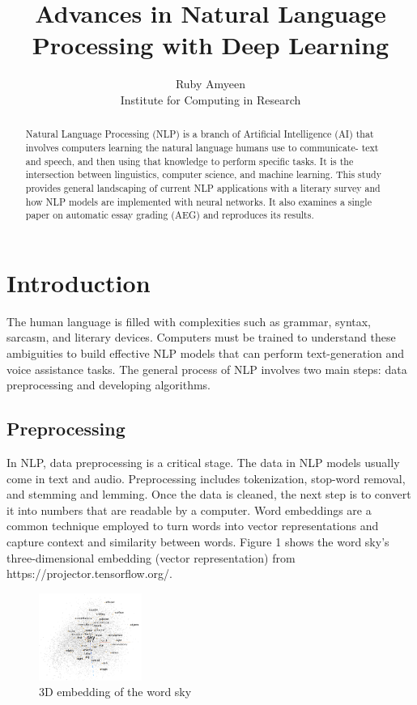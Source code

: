 \documentclass[11pt]{article}
\title{Advances in Natural Language Processing with Deep Learning}
\author{Ruby Amyeen \\
  Institute for Computing in Research \\
  }
\begin{document}
\maketitle
\begin{abstract}
Natural Language Processing (NLP) is a branch of Artificial Intelligence (AI) that involves computers learning the natural language humans use to communicate- text and speech, and then using that knowledge to perform specific tasks. It is the intersection between linguistics, computer science, and machine learning. 
This study provides general landscaping of current NLP applications with a literary survey and how NLP models are implemented with neural networks. It also examines a single paper on automatic essay grading (AEG) and reproduces its results.


\end{abstract}

\section{Introduction}
The human language is filled with complexities such as grammar, syntax, sarcasm, and literary devices. Computers must be trained to understand these ambiguities to build effective NLP models that can perform text-generation and voice assistance tasks. The general process of NLP involves two main steps: data preprocessing and developing algorithms.

\subsection{Preprocessing}
In NLP, data preprocessing is a critical stage. The data in NLP models usually come in text and audio. Preprocessing includes tokenization, stop-word removal, and stemming and lemming. Once the data is cleaned, the next step is to convert it into numbers that are readable by a computer. Word embeddings are a common technique employed to turn words into vector representations and capture context and similarity between words. 
Figure 1 shows the word sky's three-dimensional embedding (vector representation) from https://projector.tensorflow.org/.

\begin{figure}
\centering
\includegraphics[width=0.3\textwidth]{sky_word_embedding.png}
\caption{3D embedding of the word sky}
\end{figure}
\end{document}
